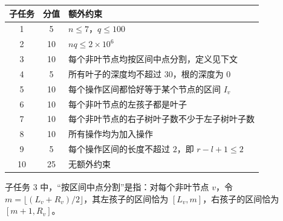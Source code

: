 \documentclass[12pt,a4paper,oneside]{ctexart}
\newenvironment{centeredtable}{\par\vspace{.35em}\setlength{\tabcolsep}{4pt}\begin{center}}{\end{center}\vspace{.35em}}
\begin{document}
\begin{centeredtable}\begin{tabularx}{0.85\textwidth}{|c|c|X|}\hline
子任务 & 分值 & 额外约束\\\hline
1 & 5 & \(n\le7\)，\(q\le100\)\\\hline
2 & 10 & \(nq\le2\times10^6\)\\\hline
3 & 10 & 每个非叶节点均按区间中点分割，定义见下文\\\hline
4 & 5 & 所有叶子的深度均不超过 \(30\)，根的深度为 \(0\)\\\hline
5 & 10 & 每个操作区间都恰好等于某个节点的区间 \(I_v\)\\\hline
6 & 10 & 每个非叶节点的左孩子都是叶子\\\hline
7 & 10 & 每个非叶节点的右子树叶子数不少于左子树叶子数\\\hline
8 & 10 & 所有操作均为加入操作\\\hline
9 & 5 & 每个操作区间的长度不超过 \(2\)，即 \(r-l+1\le2\)\\\hline
10 & 25 & 无额外约束\\\hline\end{tabularx}\end{centeredtable}

子任务 3 中，``按区间中点分割''是指：对每个非叶节点 \(v\)，令 \(m=\lfloor(L_v+R_v)/2\rfloor\)，其左孩子的区间恰为 \([L_v,m]\)，右孩子的区间恰为 \([m+1,R_v]\)。
\end{document}
